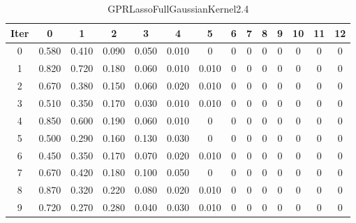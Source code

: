 \begin{table}
	\begin{center}
		\begin{tabular}{|c|c|c|c|c|c|c|c|c|c|c|c|c|c|}
			\hline
			Iter & 0 & 1 & 2 & 3 & 4 & 5 & 6 & 7 & 8 & 9 & 10 & 11 & 12 \\
			\hline
			0 & 0.580 & 0.410 & 0.090 & 0.050 & 0.010 & 0 & 0 & 0 & 0 & 0 & 0 & 0 & 0 \\
			\hline
			1 & 0.820 & 0.720 & 0.180 & 0.060 & 0.010 & 0.010 & 0 & 0 & 0 & 0 & 0 & 0 & 0 \\
			\hline
			2 & 0.670 & 0.380 & 0.150 & 0.060 & 0.020 & 0.010 & 0 & 0 & 0 & 0 & 0 & 0 & 0 \\
			\hline
			3 & 0.510 & 0.350 & 0.170 & 0.030 & 0.010 & 0.010 & 0 & 0 & 0 & 0 & 0 & 0 & 0 \\
			\hline
			4 & 0.850 & 0.600 & 0.190 & 0.060 & 0.010 & 0 & 0 & 0 & 0 & 0 & 0 & 0 & 0 \\
			\hline
			5 & 0.500 & 0.290 & 0.160 & 0.130 & 0.030 & 0 & 0 & 0 & 0 & 0 & 0 & 0 & 0 \\
			\hline
			6 & 0.450 & 0.350 & 0.170 & 0.070 & 0.020 & 0.010 & 0 & 0 & 0 & 0 & 0 & 0 & 0 \\
			\hline
			7 & 0.670 & 0.420 & 0.180 & 0.100 & 0.050 & 0 & 0 & 0 & 0 & 0 & 0 & 0 & 0 \\
			\hline
			8 & 0.870 & 0.320 & 0.220 & 0.080 & 0.020 & 0.010 & 0 & 0 & 0 & 0 & 0 & 0 & 0 \\
			\hline
			9 & 0.720 & 0.270 & 0.280 & 0.040 & 0.030 & 0.010 & 0 & 0 & 0 & 0 & 0 & 0 & 0 \\
			\hline
		\end{tabular}
	\end{center}
	\caption{GPRLassoFullGaussianKernel2.4}
\end{table}